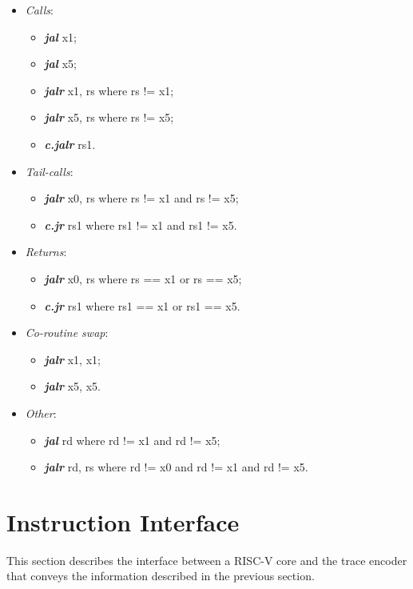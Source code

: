 \begin{itemize}
  \item \textit{Calls}: 
    \begin{itemize}
      \item \textbf{\textit{jal}} x1;
      \item \textbf{\textit{jal}} x5;
      \item \textbf{\textit{jalr}} x1, rs  where rs != x1;
      \item \textbf{\textit{jalr}} x5, rs  where rs != x5;
      \item \textbf{\textit{c.jalr}} rs1.
    \end{itemize}
  \item \textit{Tail-calls}: 
    \begin{itemize}
      \item \textbf{\textit{jalr}} x0, rs where rs != x1 and rs != x5;
      \item \textbf{\textit{c.jr}} rs1 where rs1 != x1 and rs1 != x5.
    \end{itemize}
  \item \textit{Returns}: 
    \begin{itemize}
      \item \textbf{\textit{jalr}} x0, rs where rs == x1 or rs == x5;
      \item \textbf{\textit{c.jr}} rs1 where rs1 == x1 or rs1 == x5.
    \end{itemize}
  \item \textit{Co-routine swap}: 
    \begin{itemize}
      \item \textbf{\textit{jalr}} x1, x1;
      \item \textbf{\textit{jalr}} x5, x5.
    \end{itemize}
  \item \textit{Other}: 
    \begin{itemize}
      \item \textbf{\textit{jal}} rd where rd != x1 and rd != x5;
      \item \textbf{\textit{jalr}} rd, rs where rd != x0 and rd != x1 and rd != x5.
    \end{itemize}
\end{itemize}

\section{Instruction Interface}
This section describes the interface between a RISC-V core and the
trace encoder that conveys the information described in the previous section.  


